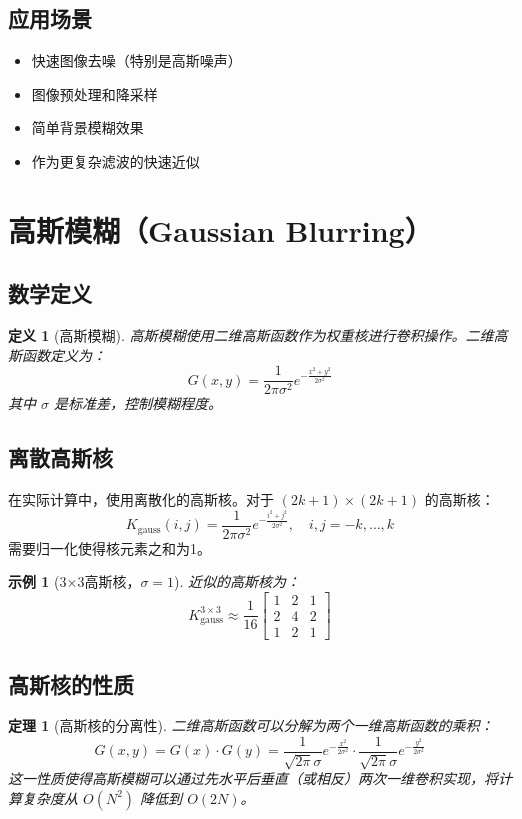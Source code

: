\documentclass{article}
\newtheorem{definition}{定义}[section]
\newtheorem{theorem}{定理}[section]
\newtheorem{example}{示例}[section]
\begin{document}
\subsection{应用场景}
\begin{itemize}
    \item 快速图像去噪（特别是高斯噪声）
    \item 图像预处理和降采样
    \item 简单背景模糊效果
    \item 作为更复杂滤波的快速近似
\end{itemize}

\section{高斯模糊（Gaussian Blurring）}

\subsection{数学定义}

\begin{definition}[高斯模糊]
高斯模糊使用二维高斯函数作为权重核进行卷积操作。二维高斯函数定义为：
\[
G(x,y) = \frac{1}{2\pi\sigma^2} e^{-\frac{x^2+y^2}{2\sigma^2}}
\]
其中 $\sigma$ 是标准差，控制模糊程度。
\end{definition}

\subsection{离散高斯核}
在实际计算中，使用离散化的高斯核。对于 $(2k+1) \times (2k+1)$ 的高斯核：
\[
K_{\text{gauss}}(i,j) = \frac{1}{2\pi\sigma^2} e^{-\frac{i^2+j^2}{2\sigma^2}}, \quad i,j = -k,\dots,k
\]
需要归一化使得核元素之和为1。

\begin{example}[3×3高斯核，$\sigma=1$]
近似的高斯核为：
\[
K_{\text{gauss}}^{3\times3} \approx \frac{1}{16} \begin{bmatrix}
1 & 2 & 1 \\
2 & 4 & 2 \\
1 & 2 & 1
\end{bmatrix}
\]
\end{example}

\subsection{高斯核的性质}

\begin{theorem}[高斯核的分离性]
二维高斯函数可以分解为两个一维高斯函数的乘积：
\[
G(x,y) = G(x) \cdot G(y) = \frac{1}{\sqrt{2\pi}\sigma} e^{-\frac{x^2}{2\sigma^2}} \cdot \frac{1}{\sqrt{2\pi}\sigma} e^{-\frac{y^2}{2\sigma^2}}
\]
这一性质使得高斯模糊可以通过先水平后垂直（或相反）两次一维卷积实现，将计算复杂度从 $O(N^2)$ 降低到 $O(2N)$。
\end{theorem}
\end{document}
